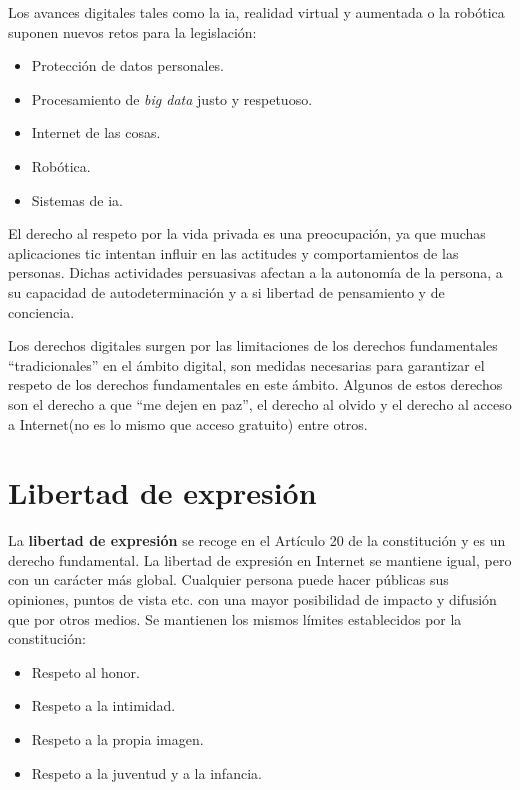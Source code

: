 
Los avances digitales tales como la \gls{ia}, realidad virtual y aumentada o la robótica suponen nuevos retos para la legislación:
\begin{itemize}
    \item Protección de datos personales.
    \item Procesamiento de \textit{big data} justo y respetuoso.
    \item Internet de las cosas.
    \item Robótica.
    \item Sistemas de \gls{ia}.
\end{itemize}

El derecho al respeto por la vida privada es una preocupación, ya que muchas aplicaciones \gls{tic} intentan influir en las actitudes y comportamientos de las personas.
Dichas actividades persuasivas afectan a la autonomía de la persona, a su capacidad de autodeterminación y a si libertad de pensamiento y de conciencia.

Los derechos digitales surgen por las limitaciones de los derechos fundamentales ``tradicionales'' en el ámbito digital, son medidas necesarias para garantizar el respeto de los derechos fundamentales en este ámbito.
Algunos de estos derechos son el derecho a que ``me dejen en paz'', el derecho al olvido y el derecho al acceso a Internet(no es lo mismo que acceso gratuito) entre otros.

\section{Libertad de expresión}

La \textbf{libertad de expresión} se recoge en el Artículo 20 de la constitución y es un derecho fundamental.
La libertad de expresión en Internet se mantiene igual, pero con un carácter más global. Cualquier persona puede hacer públicas sus opiniones, puntos de vista etc. con una mayor posibilidad de impacto y difusión que por otros medios.
Se mantienen los mismos límites establecidos por la constitución:
\begin{itemize}
    \item Respeto al honor.
    \item Respeto a la intimidad.
    \item Respeto a la propia imagen.
    \item Respeto a la juventud y a la infancia.
\end{itemize}


